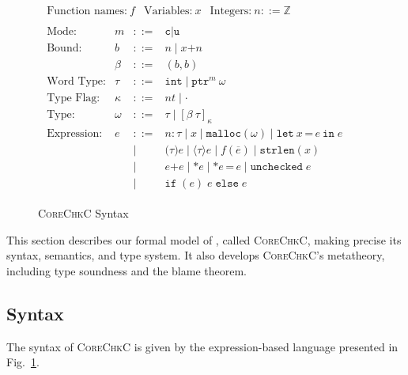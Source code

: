 \documentclass[conference]{IEEEtran}
\newcommand{\lang}{\textsc{CoreChkC}\xspace}
\newcommand{\checkedc}{\text{Checked C}\xspace}
\newcommand{\kw}[1]{\ensuremath{\mathtt{#1}}}
\newcommand{\estrlen}[1]{\ensuremath{\kw{strlen}({#1})}}
\newcommand{\tallarrayb}[2]{\ensuremath{[{#1}~{#2}]_{\kappa}}}
\newcommand{\tptr}[2]{\ensuremath{\mathtt{ptr}^{#2}~{#1}}}
\newcommand{\evalue}[2]{\ensuremath{{#1}\!:\!{#2}}}
\newcommand{\emalloc}[1]{\ensuremath{\kw{malloc}({#1})}}
\newcommand{\ecall}[2]{\ensuremath{{#1}({#2})}}
\newcommand{\ecast}[2]{\ensuremath{\kw{(}{#1}\kw{)}{#2}}}
\newcommand{\edyncast}[2]{\ensuremath{\langle{#1}\rangle{#2}}}
\newcommand{\elet}[3]{\ensuremath{\kw{let}~#1\, \texttt{=}\, #2~\kw{in}\;{#3}}}
\newcommand{\ebinop}[2]{\ensuremath{#1 \plus #2}}
\newcommand{\eassign}[2]{\ensuremath{\texttt{*}{#1}\,\texttt{=}\, {#2}}}
\newcommand{\estar}[1]{\ensuremath{\texttt{*}{#1}}}
\newcommand{\eunchecked}[1]{\ensuremath{\kw{unchecked}\;{#1}}}
\newcommand{\eif}[3]{\ensuremath{\kw{if\;}(#1)\;{#2}\;\kw{else}\;{#3}}}
\newcommand{\tint}{\ensuremath{\mathtt{int}}}
\newcommand{\plus}{\mathbin{\texttt{+}}}
\newcommand{\cmode}{\texttt{c}}
\newcommand{\umode}{\texttt{u}}
\newcommand{\bvar}{\ensuremath{\beta}}
\begin{document}
\begin{figure}
  \small \centering
  $\begin{array}{l}
\begin{array}{lll}
\text{Function names:}~f&
       \text{Variables:}~ x
& \text{Integers:}~n::=\mathbb{Z} 
\end{array}
\\[0.5em]

\begin{array}{llcllcl}

\text{Mode:} & m & ::= & \cmode \mid \umode \\[0.5em]

\text{Bound:} & b & ::= & n \mid x \plus n \\
              & \bvar & ::= & (b,b) \\[0.5em]
  
     \text{Word Type:}& \tau &::=& \tint\mid \tptr{\omega}{m}
\\[0.5em]

\text{Type Flag:}&\kappa &::=& nt \mid \cdot
\\[0.5em]

\text{Type:}&\omega &::=& \tau \mid \tallarrayb{\bvar}{\tau}
\\[0.5em]

\text{Expression:}& e & ::= & 
\evalue{n}{\tau} \mid x \mid \emalloc{\omega} \mid\elet{x}{e}{e} \\[0.2em]
&&\mid&
\ecast{\tau}{e} \mid \edyncast{\tau}{e}\mid \ecall{f}{\overline{e}} \mid \estrlen{x} \\[0.2em]
&&\mid&
\ebinop{e}{e} \mid\estar{e}\mid\eassign{e}{e}\mid\eunchecked{e}
\\[0.2em]
&&\mid&\eif{e}{e}{e}
\end{array}
    \end{array}
  $
  \caption{\lang Syntax}
  \label{fig:checkc-syn}
\end{figure}



This section describes our formal model of \checkedc, called
\lang, making precise its syntax, semantics, and type system. It also
develops \lang's metatheory, including type soundness and the blame
theorem.

\subsection{Syntax}\label{sec:syntax}

The syntax of \lang is given by the expression-based
language presented in Fig.~\ref{fig:checkc-syn}.
\end{document}
